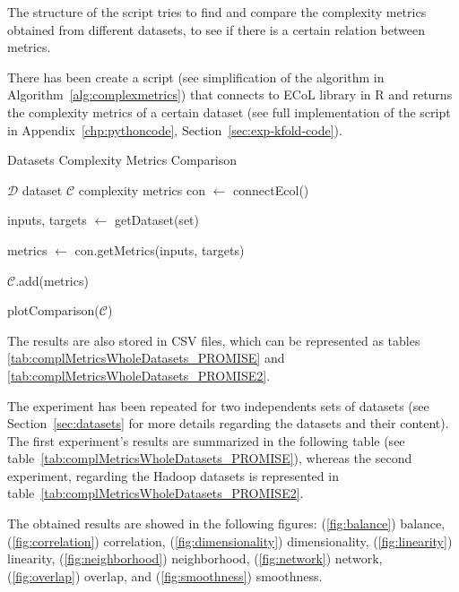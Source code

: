 The structure of the script tries to find and compare the complexity 
metrics obtained from different datasets, to see if there is a 
certain relation between metrics.

There has been create a script (see simplification of the algorithm in
Algorithm~\ref{alg:complexmetrics}) that connects to ECoL library in R
and returns the complexity metrics of a certain dataset (see full 
implementation of the script in Appendix~\ref{chp:pythoncode}, 
Section~\ref{sec:exp-kfold-code}).

\begin{breakablealgorithm}
    \caption{Datasets Complexity Metrics Comparison}
    \footnotesize
    \label{alg:complexmetrics}
    \begin{algorithmic}[1]
        \Require $\mathcal{D}$ dataset
        \Ensure $\mathcal{C}$ complexity metrics
        \State con $\leftarrow$ connectEcol()
        
        	\State inputs, targets $\leftarrow$ getDataset(set)
        	
        	\State metrics $\leftarrow$ con.getMetrics(inputs, targets)
        	
        	\State $\mathcal{C}$.add(metrics)
        \EndFor
        
    \State plotComparison($\mathcal{C}$)
    \end{algorithmic}
\end{breakablealgorithm}

The results are also stored in CSV files, which can be represented
as tables \ref{tab:complMetricsWholeDatasets_PROMISE} and
\ref{tab:complMetricsWholeDatasets_PROMISE2}.

The experiment has been repeated for two independents sets of 
datasets (see Section~\ref{sec:datasets} for more details regarding
the datasets and their content). The first experiment's results are
summarized in the following table (see 
table~\ref{tab:complMetricsWholeDatasets_PROMISE}), whereas the second
experiment, regarding the Hadoop datasets is represented in 
table~\ref{tab:complMetricsWholeDatasets_PROMISE2}.

The obtained results are showed in the following figures: 
(\ref{fig:balance}) balance, (\ref{fig:correlation}) correlation, 
(\ref{fig:dimensionality}) dimensionality, (\ref{fig:linearity}) linearity,
(\ref{fig:neighborhood}) neighborhood, (\ref{fig:network}) network,
(\ref{fig:overlap}) overlap, and (\ref{fig:smoothness}) smoothness.


